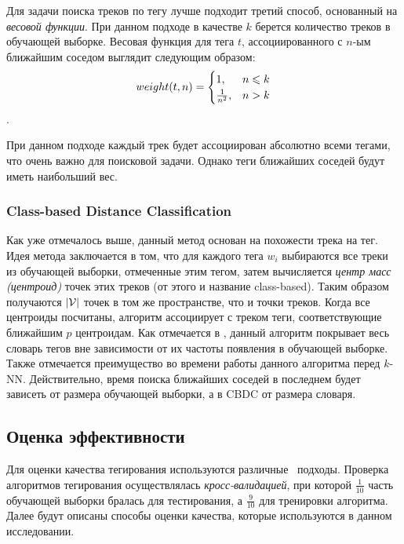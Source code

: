 Для задачи поиска треков по тегу лучше подходит третий способ, основанный на \emph{весовой функции}. При данном подходе в качестве $k$ берется количество треков в обучающей выборке.
Весовая функция для тега $t$, ассоциированного с $n$-ым ближайшим соседом выглядит следующим образом:
$$\begin{equation}
weight(t, n) = 
 \begin{cases}
   1, & n \leqslant k \\
   \frac{1}{n^2}, & n > k
 \end{cases}
\end{equation}$$.

При данном подходе каждый трек будет ассоциирован абсолютно всеми тегами, что очень важно для поисковой задачи. Однако теги ближайших соседей будут иметь наибольший вес.

\subsubsection{Class-based Distance Classification}

Как уже отмечалось выше, данный метод основан на похожести трека на тег. Идея метода заключается в том, что для каждого тега $w_i$ выбираются все треки из обучающей выборки, 
отмеченные этим тегом, затем вычисляется \emph{центр масс (центроид)} точек этих треков (от этого и название class-based). Таким образом получаются $|\mathcal{V}|$ точек в том же 
пространстве, что и точки треков. Когда все центроиды посчитаны, алгоритм ассоциирует с треком теги, соответствующие ближайшим $p$ центроидам.
Как отмечается в \cite{msordo_thesis}, данный алгоритм покрывает весь словарь тегов вне зависимости от их частоты появления в обучающей выборке. Также отмечается преимущество во времени работы
данного алгоритма перед $k$-NN. Действительно, время поиска ближайших соседей в последнем будет зависеть от размера обучающей выборки, а в CBDC \ld от размера словаря. 

\subsection{Оценка эффективности}

Для оценки качества тегирования используются различные~\cite{msordo_thesis, prec_recall, turnbull} подходы. 
Проверка алгоритмов тегирования осуществлялась \emph{кросс-валидацией}, при которой $\frac{1}{10}$ часть обучающей выборки бралась для тестирования, 
а $\frac{9}{10}$ \ld для тренировки алгоритма. Далее будут описаны способы оценки качества, которые используются в данном исследовании.


